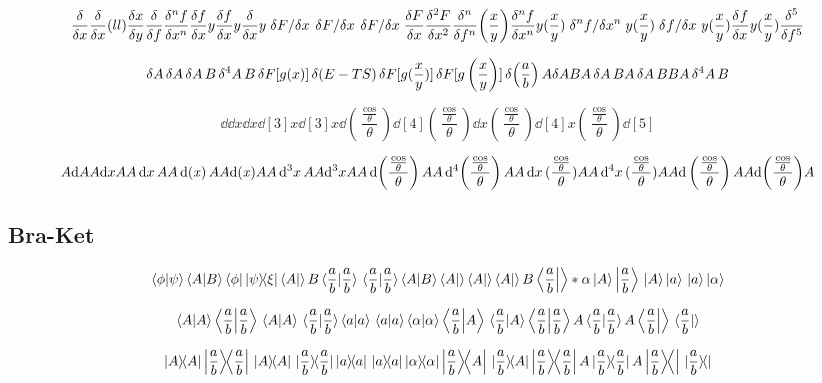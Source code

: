 \documentclass{article}
\DeclareMathOperator{\ddx}{{\rm d}(\it x)}
\begin{document}
\[
  \fdv x
  \fdv x(ll)
  \fdv{x}{y}
  \fdv{f}
  \fdv[n]{f}{x}
  \fdv{f}{x}{y}
  \fdv{f}{x}y
  \fdv{x}y
  \functionalderivative*{F}{x}
  \fderivative*{F}{x}
  \fdv*{F}{x}
  \fdv{F}{x}
  \fdv[2]{F}{x}
  \fdv[n]{f}(\frac{x}{y})
  \fdv[n]{f}{x}{y}(\frac{x}{y})
  \fdv*[n]{f}{x}{y}(\frac{x}{y})
  \fdv*[]{f}{x}{y}(\frac{x}{y})
  \fdv[]{f}{x}{y}(\frac{x}{y})
  \fdv[5]{f}
\]

\[
  \var A
  \var{A}
  \var{A}{B}
  \var[4]{A} B
  \var{F[g(x)]}
  \var(E-TS)
  \var{F[g(\frac{x}{y})]}
  \var{F[g\left(\frac{x}{y}\right)]}
  \var(\frac{a}{b})
  A \var A B
  A \var{A} B
  A \var{A}{B} B
  A \var[4]{A} B
\]


\[
  \dd
  \dd x
  \dd{x}
  \dd[3]{x}
  \dd[3]x
  \dd(\frac{\frac{\cos}{\theta}}{\theta})
  \dd[4](\frac{\frac{\cos}{\theta}}{\theta})
  \dd{x}(\frac{\frac{\cos}{\theta}}{\theta})
  \dd[4]{x}(\frac{\frac{\cos}{\theta}}{\theta})
  \dd[5]
\]

\[
  A\dd A
  A\dd x A
  A\dd{x} A
  A\ddx A
  A{{\rm d}(\it x)}A
  A\dd[3]{x} A
  A\dd[3]x A
  A\dd(\frac{\frac{\cos}{\theta}}{\theta}) A
  A\dd[4](\frac{\frac{\cos}{\theta}}{\theta})A
  A\dd{x}(\frac{\frac{\cos}{\theta}}{\theta})A
  A\dd[4]{x}(\frac{\frac{\cos}{\theta}}{\theta})A
  A{\rm d}\left(\frac{\frac{\cos}{\theta}}{\theta}\right) A
  A{\rm d}{\left(\frac{\frac{\cos}{\theta}}{\theta}\right)} A
\]


\newpage
\subsection*{Bra-Ket}

\[
  \bra{\phi}\ket{\psi}
  \bra{A}\ket{B}
  \bra{\phi}\dyad{\psi}{\xi}
  \bra A  \ket B
  \bra*{\frac{a}{b}}  \ket{\frac{a}{b}}
  \bra{\frac{a}{b}}  \ket*{\frac{a}{b}}
  \bra A\ket{B}
  \bra A\ket 
  \bra {A}\ket 
  \bra {A}\ket B
  \bra {\frac{a}{b}} \ket* \alpha
  \ket{A}
  \ket{\frac{a}{b}}
  \ket*{A}
  \ket a
  \ket* a
  \ket \alpha
\]

\[
  \braket{A}
  \braket{\frac{a}{b}}
  \braket*{A}
  \braket*{\frac{a}{b}}
  \braket a
  \braket* a
  \braket \alpha
  \braket{\frac{a}{b}}{A}
  \braket*{\frac{a}{b}}{A}
  \braket{\frac{a}{b}}  A
  \braket*{\frac{a}{b}}   A
  \braket{\frac{a}{b}}{} 
  \braket*{\frac{a}{b}}{}
\]

\[
  \ketbra{A}
  \ketbra{\frac{a}{b}}
  \ketbra*{A}
  \ketbra*{\frac{a}{b}}
  \ketbra a
  \ketbra* a
  \ketbra \alpha
  \ketbra{\frac{a}{b}}{A}
  \ketbra*{\frac{a}{b}}{A}
  \ketbra{\frac{a}{b}}  A
  \ketbra*{\frac{a}{b}}   A
  \ketbra{\frac{a}{b}}{} 
  \ketbra*{\frac{a}{b}}{}
\]
\end{document}
